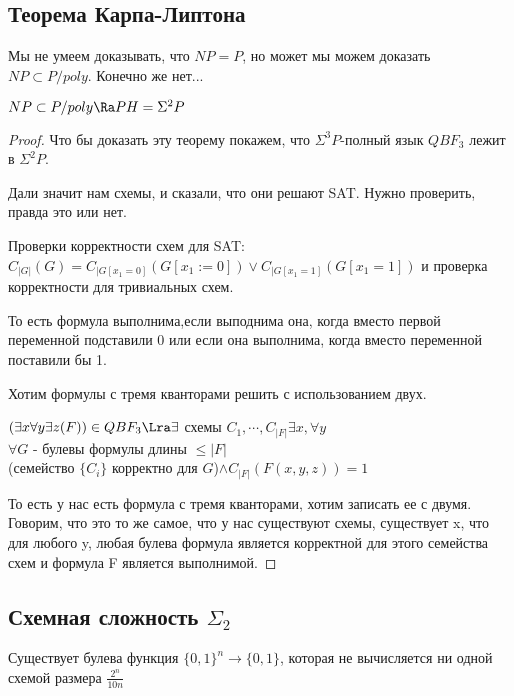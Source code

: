 \subsection{Теорема Карпа-Липтона}

Мы не умеем доказывать, что $NP = P$, но может мы можем доказать $NP \subset P/poly$. Конечно же нет...

\begin{theorem}
	$NP \subset P/poly \Ra PH = \Sigma^2P$\\
\end{theorem}
\begin{proof}
	Что бы доказать эту теорему покажем, что $\Sigma^3P$-полный язык $QBF_3$ лежит в $\Sigma^2P$.

	Дали значит нам схемы, и сказали, что они решают SAT. Нужно проверить, правда это или нет. 

	Проверки корректности схем для SAT:
	$C_{|G|}(G) = C_{|G[x_1 = 0]}(G[x_1:= 0]) \vee C_{|G[x_1 = 1]}(G[x_1 = 1])$ и проверка корректности для тривиальных схем.

	То есть формула выполнима,если выподнима она, когда вместо первой переменной подставили 0 или если она выполнима, когда вместо переменной 
	поставили бы 1. 

	Хотим формулы с тремя кванторами решить с использованием двух.
	
	$(\exists x \forall y \exists z (F)) \in QBF_3 \Lra
	\exists$ схемы $C_1, \cdots, C_{|F|} \exists x, \forall y$\\
	$\forall G$ - булевы формулы длины $\le |F|$\\
	(семейство $\{C_i\}$ корректно для $G$)$\wedge C_{|F|}(F(x,y,z)) = 1$

        То есть у нас есть формула с тремя кванторами, хотим записать ее с двумя. 
        Говорим, что это то же самое, что у нас существуют схемы, существует x, 
        что для любого y, любая булева формула является корректной для этого семейства схем и 
        формула F является выполнимой. 
\end{proof}

\subsection[Схемная сложность Sigma-2]{Схемная сложность $\Sigma_2$}
\begin{theorem}
	Существует булева функция $\{0, 1\}^{n} \to \{0, 1\}$, 
	которая не вычисляется ни одной схемой размера $\frac{2^n}{10n}$
\end{theorem}


